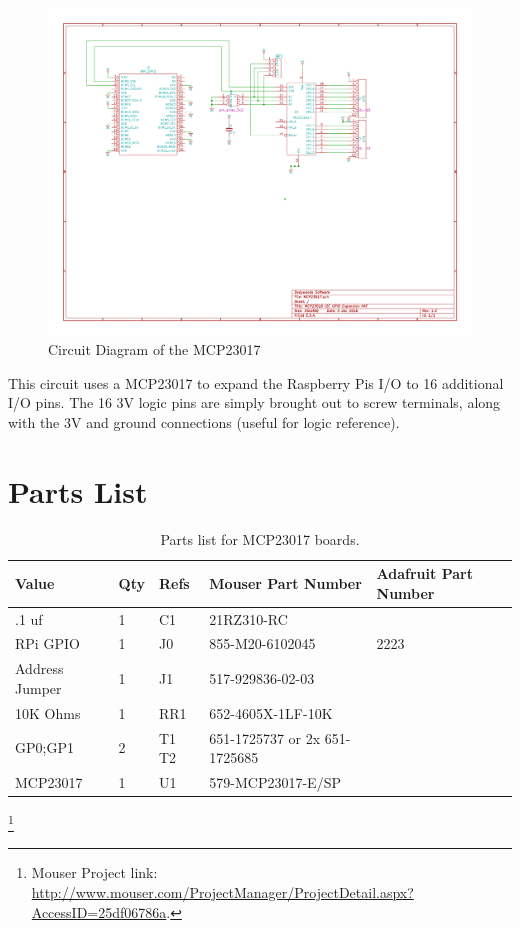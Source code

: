 \begin{figure}[hbpt]\begin{centering}%
\includegraphics[width=5in]{MCP23017.pdf}
\caption{Circuit Diagram of the MCP23017}
\end{centering}\end{figure}
This circuit uses a MCP23017 to expand the Raspberry Pis I/O to 16 additional 
I/O pins. The 16 3V logic pins are simply brought out to screw terminals, 
along with the 3V and ground connections (useful for logic reference).

\section{Parts List}

\begin{table}[htp]
\begin{centering}\begin{tabular}{|l|l|p{1in}|l|p{.5in}|}
\hline
Value&Qty&Refs&Mouser Part Number&Adafruit Part Number\\
\hline
.1 uf&1&C1&21RZ310-RC&\\
\hline
RPi GPIO&1&J0&855-M20-6102045&2223\\
\hline
Address Jumper&1&J1&517-929836-02-03&\\
\hline
10K Ohms&1&RR1&652-4605X-1LF-10K&\\
\hline
GP0;GP1&2&T1 T2&651-1725737 or 2x 651-1725685&\\
\hline
MCP23017&1&U1&579-MCP23017-E/SP&\\
\hline
\end{tabular}
\caption{Parts list for MCP23017 boards.}
\end{centering}\end{table}\footnote{Mouser Project link: 
\url{http://www.mouser.com/ProjectManager/ProjectDetail.aspx?AccessID=25df06786a}.}

